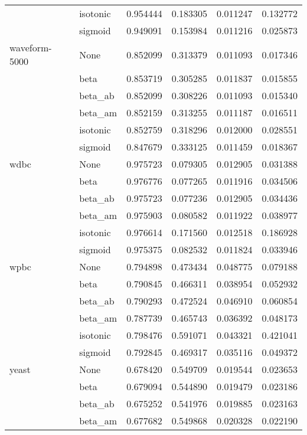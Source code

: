 \begin{tabular}{llrrrr}
        & isotonic &  0.954444 &  0.183305 &  0.011247 &  0.132772 \\
        & sigmoid &  0.949091 &  0.153984 &  0.011216 &  0.025873 \\
waveform-5000 & None &  0.852099 &  0.313379 &  0.011093 &  0.017346 \\
        & beta &  0.853719 &  0.305285 &  0.011837 &  0.015855 \\
        & beta\_ab &  0.852099 &  0.308226 &  0.011093 &  0.015340 \\
        & beta\_am &  0.852159 &  0.313255 &  0.011187 &  0.016511 \\
        & isotonic &  0.852759 &  0.318296 &  0.012000 &  0.028551 \\
        & sigmoid &  0.847679 &  0.333125 &  0.011459 &  0.018367 \\
wdbc & None &  0.975723 &  0.079305 &  0.012905 &  0.031388 \\
        & beta &  0.976776 &  0.077265 &  0.011916 &  0.034506 \\
        & beta\_ab &  0.975723 &  0.077236 &  0.012905 &  0.034436 \\
        & beta\_am &  0.975903 &  0.080582 &  0.011922 &  0.038977 \\
        & isotonic &  0.976614 &  0.171560 &  0.012518 &  0.186928 \\
        & sigmoid &  0.975375 &  0.082532 &  0.011824 &  0.033946 \\
wpbc & None &  0.794898 &  0.473434 &  0.048775 &  0.079188 \\
        & beta &  0.790845 &  0.466311 &  0.038954 &  0.052932 \\
        & beta\_ab &  0.790293 &  0.472524 &  0.046910 &  0.060854 \\
        & beta\_am &  0.787739 &  0.465743 &  0.036392 &  0.048173 \\
        & isotonic &  0.798476 &  0.591071 &  0.043321 &  0.421041 \\
        & sigmoid &  0.792845 &  0.469317 &  0.035116 &  0.049372 \\
yeast & None &  0.678420 &  0.549709 &  0.019544 &  0.023653 \\
        & beta &  0.679094 &  0.544890 &  0.019479 &  0.023186 \\
        & beta\_ab &  0.675252 &  0.541976 &  0.019885 &  0.023163 \\
        & beta\_am &  0.677682 &  0.549868 &  0.020328 &  0.022190 \\

\end{tabular}
